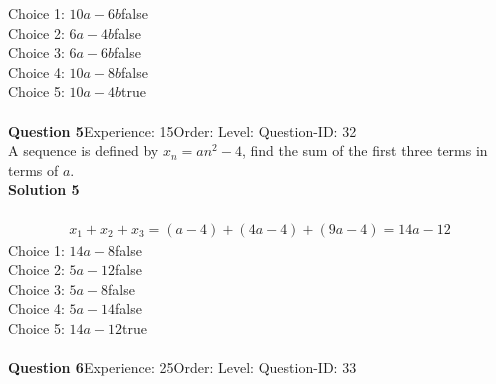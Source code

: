 \documentclass{article}
\begin{document}
Choice 1: \hspace{20pt}$10a-6b$\hspace{20pt}false\\
Choice 2: \hspace{20pt}$6a-4b$\hspace{20pt}false\\
Choice 3: \hspace{20pt}$6a-6b$\hspace{20pt}false\\
Choice 4: \hspace{20pt}$10a-8b$\hspace{20pt}false\\
Choice 5: \hspace{20pt}$10a-4b$\hspace{20pt}true\\
\\[4pt]
\noindent\textbf{Question 5}\hspace{20pt}Experience: 15\hspace{20pt}Order: \hspace{20pt}Level: \hspace{20pt}Question-ID: 32\\[2pt]
A sequence is defined by $x_n=an^2-4$, find the sum of the first three terms in terms of $a$.\\[4pt]
\noindent\textbf{Solution 5}\\[2pt]
\\[-35pt]\begin{align*}
x_1+x_2+x_3=(a-4)+(4a-4)+(9a-4)=14a-12
\end{align*}
Choice 1: \hspace{20pt}$14a-8$\hspace{20pt}false\\
Choice 2: \hspace{20pt}$5a-12$\hspace{20pt}false\\
Choice 3: \hspace{20pt}$5a-8$\hspace{20pt}false\\
Choice 4: \hspace{20pt}$5a-14$\hspace{20pt}false\\
Choice 5: \hspace{20pt}$14a-12$\hspace{20pt}true\\
\\[4pt]
\noindent\textbf{Question 6}\hspace{20pt}Experience: 25\hspace{20pt}Order: \hspace{20pt}Level: \hspace{20pt}Question-ID: 33\\[2pt]
\end{document}
